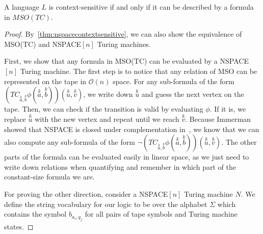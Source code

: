 \begin{theorem}
    \label{thm:contextsensitveMSOTC}
    A language $L$ is context-sensitive if and only if it can be described by a formula in $MSO(TC)$.
\end{theorem}

\begin{proof}
    By~\cref{thm:nspacecontextsensitive}, we can also show the equivalence of MSO(TC) and NSPACE$[n]$ Turing machines.

    First, we show that any formula in MSO(TC) can be evaluated by a NSPACE$[n]$ Turing machine.
    The first step is to notice that any relation of MSO can be represented on the tape in $\mathcal{O}(n)$ space.
    For any sub-formula of the form $\left(TC_{\overset{k}{a}, \overset{k}{b}}\phi\left(\overset{k}{a}, \overset{k}{b}\right)\right)\left(\overset{k}{u}, \overset{k}{v}\right)$, we write down $\overset{k}{u}$ and guess the next vertex on the tape.
    Then, we can check if the transition is valid by evaluating $\phi$.
    If it is, we replace $\overset{k}{u}$ with the new vertex and repeat until we reach $\overset{k}{v}$.
    Because Immerman showed that NSPACE is closed under complementation in~\cite{Immerman1988}, we know that we can also compute any sub-formula of the form $\neg\left(TC_{\overset{k}{a}, \overset{k}{b}}\phi\left(\overset{k}{a}, \overset{k}{b}\right)\right)\left(\overset{k}{u}, \overset{k}{v}\right)$.
    The other parts of the formula can be evaluated easily in linear space, as we just need to write down relations when quantifying and remember in which part of the constant-size formula we are.

    \vspace{5mm}

    For proving the other direction, consider a NSPACE$[n]$ Turing machine $N$.
    We define the string vocabulary for our logic to be over the alphabet $\Sigma$ which contains the symbol $b_{a_i, q_j}$ for all pairs of tape symbols and Turing machine states.


\end{proof}
